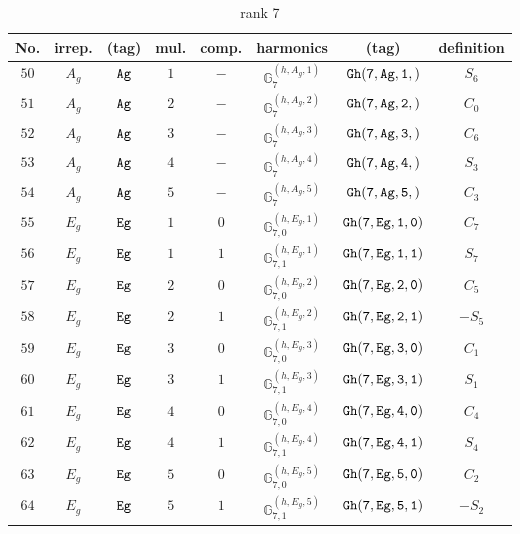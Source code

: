 \documentclass[fleqn,8pt]{jsarticle}
\begin{document}
\begin{table}[ht!]
\begin{center}
\caption{rank 7}
\renewcommand{\arraystretch}{1.3}
\begin{tabular}{cccccccc} \hline \hline
No. & irrep. & (tag) & mul. & comp. & harmonics & (tag) & definition \\ \hline
$ 50 $ & $ A_{g} $ & $ {\tt Ag} $ & $ 1 $ & $ - $ & $ \mathbb{G}_{7}^{(h,A_{g},1)} $ & $ {\tt Gh(7,Ag,1,)} $ & $ S_{6} $ \\
$ 51 $ & $ A_{g} $ & $ {\tt Ag} $ & $ 2 $ & $ - $ & $ \mathbb{G}_{7}^{(h,A_{g},2)} $ & $ {\tt Gh(7,Ag,2,)} $ & $ C_{0} $ \\
$ 52 $ & $ A_{g} $ & $ {\tt Ag} $ & $ 3 $ & $ - $ & $ \mathbb{G}_{7}^{(h,A_{g},3)} $ & $ {\tt Gh(7,Ag,3,)} $ & $ C_{6} $ \\
$ 53 $ & $ A_{g} $ & $ {\tt Ag} $ & $ 4 $ & $ - $ & $ \mathbb{G}_{7}^{(h,A_{g},4)} $ & $ {\tt Gh(7,Ag,4,)} $ & $ S_{3} $ \\
$ 54 $ & $ A_{g} $ & $ {\tt Ag} $ & $ 5 $ & $ - $ & $ \mathbb{G}_{7}^{(h,A_{g},5)} $ & $ {\tt Gh(7,Ag,5,)} $ & $ C_{3} $ \\
$ 55 $ & $ E_{g} $ & $ {\tt Eg} $ & $ 1 $ & $ 0 $ & $ \mathbb{G}_{7,0}^{(h,E_{g},1)} $ & $ {\tt Gh(7,Eg,1,0)} $ & $ C_{7} $ \\
$ 56 $ & $ E_{g} $ & $ {\tt Eg} $ & $ 1 $ & $ 1 $ & $ \mathbb{G}_{7,1}^{(h,E_{g},1)} $ & $ {\tt Gh(7,Eg,1,1)} $ & $ S_{7} $ \\
$ 57 $ & $ E_{g} $ & $ {\tt Eg} $ & $ 2 $ & $ 0 $ & $ \mathbb{G}_{7,0}^{(h,E_{g},2)} $ & $ {\tt Gh(7,Eg,2,0)} $ & $ C_{5} $ \\
$ 58 $ & $ E_{g} $ & $ {\tt Eg} $ & $ 2 $ & $ 1 $ & $ \mathbb{G}_{7,1}^{(h,E_{g},2)} $ & $ {\tt Gh(7,Eg,2,1)} $ & $ - S_{5} $ \\
$ 59 $ & $ E_{g} $ & $ {\tt Eg} $ & $ 3 $ & $ 0 $ & $ \mathbb{G}_{7,0}^{(h,E_{g},3)} $ & $ {\tt Gh(7,Eg,3,0)} $ & $ C_{1} $ \\
$ 60 $ & $ E_{g} $ & $ {\tt Eg} $ & $ 3 $ & $ 1 $ & $ \mathbb{G}_{7,1}^{(h,E_{g},3)} $ & $ {\tt Gh(7,Eg,3,1)} $ & $ S_{1} $ \\
$ 61 $ & $ E_{g} $ & $ {\tt Eg} $ & $ 4 $ & $ 0 $ & $ \mathbb{G}_{7,0}^{(h,E_{g},4)} $ & $ {\tt Gh(7,Eg,4,0)} $ & $ C_{4} $ \\
$ 62 $ & $ E_{g} $ & $ {\tt Eg} $ & $ 4 $ & $ 1 $ & $ \mathbb{G}_{7,1}^{(h,E_{g},4)} $ & $ {\tt Gh(7,Eg,4,1)} $ & $ S_{4} $ \\
$ 63 $ & $ E_{g} $ & $ {\tt Eg} $ & $ 5 $ & $ 0 $ & $ \mathbb{G}_{7,0}^{(h,E_{g},5)} $ & $ {\tt Gh(7,Eg,5,0)} $ & $ C_{2} $ \\
$ 64 $ & $ E_{g} $ & $ {\tt Eg} $ & $ 5 $ & $ 1 $ & $ \mathbb{G}_{7,1}^{(h,E_{g},5)} $ & $ {\tt Gh(7,Eg,5,1)} $ & $ - S_{2} $ \\
 \hline \hline
\end{tabular}
\end{center}
\end{table}
\end{document}
